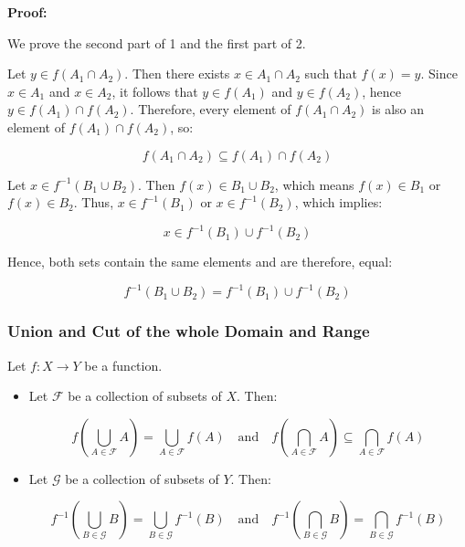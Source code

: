 \textbf{Proof:}

We prove the second part of 1 and the first part of 2.
\vspace{\baselineskip}

Let \( y \in f(A_1 \cap A_2) \). Then there exists \( x \in A_1 \cap A_2 \) such that 
\( f(x) = y \). Since \( x \in A_1 \) and \( x \in A_2 \), it follows that \( y \in f(A_1) \) 
and \( y \in f(A_2) \), hence \( y \in f(A_1) \cap f(A_2) \). Therefore, every element of 
\( f(A_1 \cap A_2) \) is also an element of \( f(A_1) \cap f(A_2) \), so:

\[
	f(A_1 \cap A_2) \subseteq f(A_1) \cap f(A_2)
\]

Let \( x \in f^{-1} (B_1 \cup B_2) \). Then \( f(x) \in B_1 \cup B_2 \), which means \( f(x) \in B_1 \) 
or \( f(x) \in B_2 \). Thus, \( x \in f^{-1}(B_1) \) 
or \( x \in f^{-1}(B_2) \), which implies:
	      
\[
	 x \in f^{-1}(B_1) \cup f^{-1}(B_2)
\]

Hence, both sets contain the same elements and are therefore, equal:
	      
\[
	f^{-1}(B_1 \cup B_2) = f^{-1}(B_1) \cup f^{-1}(B_2)
\]

\QED

\subsubsection{Union and Cut of the whole Domain and Range}

Let \( f : X \to Y \) be a function.

\begin{itemize}

	\item Let \( \mathcal{F} \) be a collection of subsets of \( X \). Then:

   	      \[
		      f\left( \bigcup_{A \in \mathcal{F}} A \right) = \bigcup_{A \in \mathcal{F}} f(A)
		      \quad \text{and} \quad
		      f\left( \bigcap_{A \in \mathcal{F}} A \right) \subseteq \bigcap_{A \in \mathcal{F}} f(A)
	      \]

	\item Let \( \mathcal{G} \) be a collection of subsets of \( Y \). Then:

	      \[
		      f^{-1}\left( \bigcup_{B \in \mathcal{G}} B \right) = \bigcup_{B \in \mathcal{G}} f^{-1}(B)
		      \quad \text{and} \quad
		      f^{-1}\left( \bigcap_{B \in \mathcal{G}} B \right) = \bigcap_{B \in \mathcal{G}} f^{-1}(B)
	      \]

\end{itemize}

